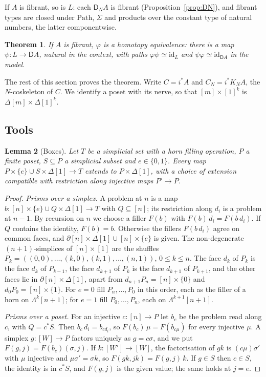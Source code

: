 \documentclass[11pt]{article}
\newcommand{\Path}{\mathrm{Path}}
\newcommand{\id}{\mathrm{id}}
\newcommand{\D}{\mathsf{D}}
\newcommand{\Lam}{\Lambda}
\theoremstyle{plain}
\newtheorem{theorem}{Theorem}[section]
\newtheorem{lemma}[theorem]{Lemma}
\theoremstyle{definition}
\theoremstyle{remark}
\begin{document}
If $A$ is fibrant, so is $L$: each $\D_NA$ is fibrant
(Proposition~\ref{prop:DN}), and fibrant types are closed under $\Path$,
$\Sigma$ and products over the constant type of natural numbers, the
latter componentwise.

\begin{theorem}\label{thm:hlim}
If $A$ is fibrant, $\varphi$ is a homotopy equivalence: there is a map
$\psi:L\to\D A$, natural in the context, with paths
$\varphi\psi\simeq\id_L$ and $\psi\varphi\simeq\id_{\D A}$ in the model.
\end{theorem}

The rest of this section proves the theorem. Write $C=i^*A$ and
$C_N=i^*K_NA$, the $N$-coskeleton of $C$. We identify a poset with its
nerve, so that $[m]\times[1]^k$ is $\Delta[m]\times\Delta[1]^k$.

\subsection{Tools}

\begin{lemma}[Boxes]\label{lem:box}
Let $T$ be a simplicial set with a horn filling operation, $P$ a finite
poset, $S\subseteq P$ a simplicial subset and $e\in\{0,1\}$. Every map
$P\times\{e\}\cup S\times\Delta[1]\to T$ extends to $P\times\Delta[1]$,
with a choice of extension compatible with restriction along injective
maps $P'\to P$.
\end{lemma}

\begin{proof}
\emph{Prisms over a simplex.} A problem at $n$ is a map
$b:[n]\times\{e\}\cup Q\times\Delta[1]\to T$ with $Q\subseteq[n]$; its
restriction along $d_i$ is a problem at $n-1$. By recursion on $n$ we
choose a filler $F(b)$ with $F(b)\,d_i=F(b\,d_i)$. If $Q$ contains the
identity, $F(b)=b$. Otherwise the fillers $F(b\,d_i)$ agree on common
faces, and $\partial[n]\times\Delta[1]\cup[n]\times\{e\}$ is given. The
non-degenerate $(n+1)$-simplices of $[n]\times[1]$ are the shuffles
$P_k=((0,0),\dots,(k,0),(k,1),\dots,(n,1))$, $0\le k\le n$. The face $d_k$
of $P_k$ is the face $d_k$ of $P_{k-1}$, the face $d_{k+1}$ of $P_k$ is the
face $d_{k+1}$ of $P_{k+1}$, and the other faces lie in
$\partial[n]\times\Delta[1]$, apart from $d_{n+1}P_n=[n]\times\{0\}$ and
$d_0P_0=[n]\times\{1\}$. For $e=0$ fill $P_n,\dots,P_0$ in this order, each
as the filler of a horn on $\Lam^k[n+1]$; for $e=1$ fill $P_0,\dots,P_n$,
each on $\Lam^{k+1}[n+1]$.

\emph{Prisms over a poset.} For an injective $c:[n]\to P$ let $b_c$ be the
problem read along $c$, with $Q=c^*S$. Then $b_c\,d_i=b_{cd_i}$, so
$F(b_c)\,\mu=F(b_{c\mu})$ for every injective $\mu$. A simplex $g:[W]\to P$
factors uniquely as $g=c\sigma$, and we put $F(g,j)=F(b_c)(\sigma,j)$. If
$k:[W']\to[W]$, the factorisation of $gk$ is $(c\mu)\sigma'$ with $\mu$
injective and $\mu\sigma'=\sigma k$, so $F(gk,jk)=F(g,j)\,k$. If $g\in S$
then $c\in S$, the identity is in $c^*S$, and $F(g,j)$ is the given value;
the same holds at $j=e$.
\end{proof}
\end{document}
